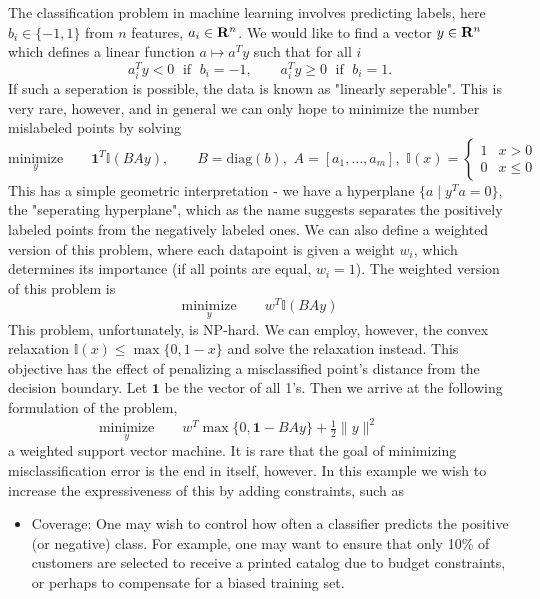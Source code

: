 \begin{example} \label{ex:dataset-constraints}
The classification problem in machine learning involves predicting labels,
here $b_i \in \{-1,1\}$ from $n$ features, $a_i \in \mathbf{R}^n$. We would
like to find a vector $y \in \mathbf{R}^n$ which defines a linear function $a \mapsto a^Ty$ such that for all $i$
$$a_i^Ty < 0 \; \mbox{ if }\;  b_i = -1, \qquad 
a_i^Ty \geq 0 \; \mbox{ if }\; b_i = 1.$$ 
If such a seperation is possible, the data is known as "linearly seperable". This is very
rare, however, and in general we can only hope to minimize the number mislabeled points by solving
$$
\underset{y}{\mbox{minimize}}\qquad \mathbf{1}^{T}\mathbb{I}(BAy), \qquad B = \mbox{diag}(b), \,\, A = [a_1,\dots,a_m], \,\, \mathbb{I}(x)=\begin{cases}
1 & x>0\\
0 & x\leq0
\end{cases}
$$ 
This has a simple geometric interpretation - we have a hyperplane $\{ a \mid
y^Ta = 0 \}$, the "seperating hyperplane", which as the name suggests
separates the positively labeled points from the negatively labeled ones.  We
can also define a weighted version of this problem, where each datapoint is
given a weight $w_i$, which determines its importance (if all points are
equal, $w_i = 1$). The weighted version of this problem is
$$
\underset{y}{\mbox{minimize}}\qquad w^{T}\mathbb{I}(BAy)
$$ 
This problem, unfortunately, is NP-hard. We can employ, however, the convex relaxation
$\mathbb{I}(x)\leq \max\{0, 1- x\}$ and solve the relaxation instead. This objective has
the effect of penalizing a misclassified point's distance from the decision
boundary. Let $\mathbf{1}$ be the vector of all 1's. Then we arrive at the following formulation of the problem,
$$
\underset{y}{\mbox{minimize}}\qquad w^{T}\max\{0,\mathbf{1}-BAy\}+\tfrac{1}{2}\|y\|^{2}
\qquad \quad
$$ 
a weighted support vector machine. It is
rare that the goal of minimizing misclassification error is the end in
itself, however. In this example we wish to increase the expressiveness of
this by adding constraints, such as
\begin{itemize}

\item  {Coverage}: One may wish to control how often a classifier predicts the
positive (or negative) class. For example, one may want to ensure that only
10\% of customers are selected to receive a printed catalog due to budget
constraints, or perhaps to compensate for a biased training set.


\end{itemize}
\end{example}
